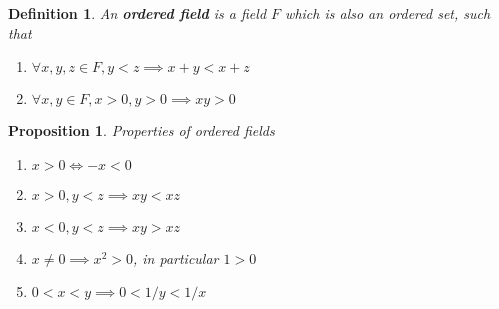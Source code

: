 \documentclass[aps,pra,onecolumn,notitlepage,superscriptaddress]{revtex4-1}
\newtheorem{prop}{Proposition}
\newtheorem{defi}{Definition}
\begin{document}
    \begin{defi}
        An \textbf{ordered field} is a field $F$ which is also an ordered set, such that
        \begin{enumerate}
            \item $\forall x,y,z \in F, y<z \implies x+y < x+z$
            \item $\forall x,y \in F, x>0, y>0 \implies xy > 0$
        \end{enumerate}
    \end{defi}

    \begin{prop} Properties of ordered fields
        \begin{enumerate}
            \item $x > 0 \Longleftrightarrow -x < 0$
            \item $x > 0, y < z \implies xy < xz$
            \item $x < 0, y < z \implies xy > xz$
            \item $x \neq 0 \implies x^2 > 0$, in particular $1 > 0$
            \item $0 < x < y \implies 0 < 1/y < 1/x$
        \end{enumerate}
    \end{prop}
\end{document}
